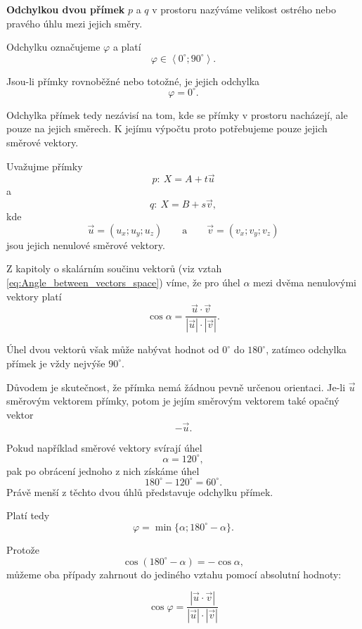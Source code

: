 \begin{definition}
    \label{def:Angle_between_lines_space}
    \textbf{Odchylkou dvou přímek} $p$ a $q$ v prostoru nazýváme
    velikost ostrého nebo pravého úhlu mezi jejich směry.

    Odchylku označujeme $\varphi$ a platí
    \[
        \varphi\in\left\langle 0^\circ;90^\circ\right\rangle.
    \]

    Jsou-li přímky rovnoběžné nebo totožné, je jejich odchylka
    \[
        \varphi=0^\circ.
    \]
\end{definition}

Odchylka přímek tedy nezávisí na tom, kde se přímky v prostoru
nacházejí, ale pouze na jejich směrech. K jejímu výpočtu proto
potřebujeme pouze jejich směrové vektory.

Uvažujme přímky
\[
    p:\ X=A+t\vec{u}
\]
a
\[
    q:\ X=B+s\vec{v},
\]
kde
\[
    \vec{u}=(u_x;u_y;u_z)
    \qquad\text{a}\qquad
    \vec{v}=(v_x;v_y;v_z)
\]
jsou jejich nenulové směrové vektory.

Z kapitoly o skalárním součinu vektorů
(viz vztah \ref{eq:Angle_between_vectors_space}) víme, že pro úhel
$\alpha$ mezi dvěma nenulovými vektory platí
\[
    \cos\alpha
    =
    \frac{\vec{u}\cdot\vec{v}}
         {|\vec{u}|\cdot|\vec{v}|}.
\]

Úhel dvou vektorů však může nabývat hodnot od $0^\circ$ do
$180^\circ$, zatímco odchylka přímek je vždy nejvýše $90^\circ$.

Důvodem je skutečnost, že přímka nemá žádnou pevně určenou orientaci.
Je-li $\vec{u}$ směrovým vektorem přímky, potom je jejím směrovým
vektorem také opačný vektor
\[
    -\vec{u}.
\]

Pokud například směrové vektory svírají úhel
\[
    \alpha=120^\circ,
\]
pak po obrácení jednoho z nich získáme úhel
\[
    180^\circ-120^\circ=60^\circ.
\]
Právě menší z těchto dvou úhlů představuje odchylku přímek.

Platí tedy
\[
    \varphi
    =
    \min\{\alpha;180^\circ-\alpha\}.
\]

Protože
\[
    \cos(180^\circ-\alpha)=-\cos\alpha,
\]
můžeme oba případy zahrnout do jediného vztahu pomocí absolutní
hodnoty:

\begin{equation}
        \cos\varphi
        =
        \frac{
            \left|\vec{u}\cdot\vec{v}\right|
        }{
            |\vec{u}|\cdot|\vec{v}|
        }
    \label{eq:Angle_between_lines_space}
\end{equation}

